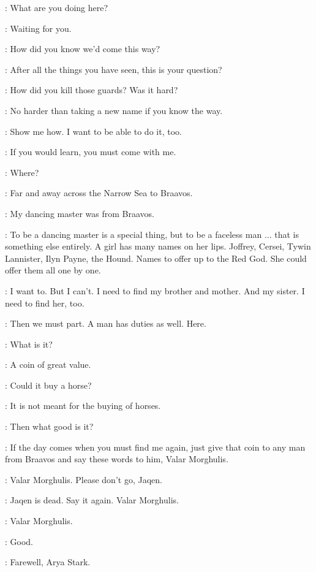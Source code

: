 \ARYA: What are you doing here? 

\JAQEN: Waiting for you. 

\ARYA: How did you know we'd come this way? 

\JAQEN: After all the things you have seen, this is your question? 

\ARYA: How did you kill those guards? Was it hard? 

\JAQEN: No harder than taking a new name if you know the way. 

\ARYA: Show me how. I want to be able to do it, too. 

\JAQEN: If you would learn, you must come with me. 

\ARYA: Where? 

\JAQEN: Far and away across the Narrow Sea to Braavos. 

\ARYA: My dancing master was from Braavos. 

\JAQEN: To be a dancing master is a special thing, but to be a faceless man $\ldots$ that is something else entirely. A girl has many names on her lips.  Joffrey, Cersei, Tywin Lannister, Ilyn Payne, the Hound. Names to offer up to the Red God. She could offer them all one by one. 

\ARYA: I want to. But I can't. I need to find my brother and mother. And my sister. I need to find her, too. 

\JAQEN: Then we must part. A man has duties as well. Here. 

\ARYA: What is it? 

\JAQEN: A coin of great value. 

\ARYA:  Could it buy a horse? 

\JAQEN: It is not meant for the buying of horses. 

\ARYA: Then what good is it? 

\JAQEN: If the day comes when you must find me again, just give that coin to any man from Braavos and say these words to him, Valar Morghulis. 

\ARYA: Valar Morghulis.  Please don't go, Jaqen. 

\JAQEN: Jaqen is dead. Say it again. Valar Morghulis. 

\ARYA: Valar Morghulis. 

\JAQEN: Good.


\JAQEN: Farewell, Arya Stark. 

